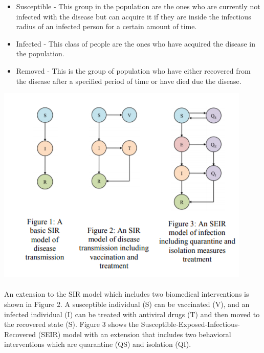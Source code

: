 \documentclass[14pt, a4paper]{extarticle}
\begin{document}
        \begin{itemize}
            \item Susceptible - This group in the population are the ones who are currently not infected with the disease but can acquire it if they are inside the infectious radius of an infected person for a certain amount of time.
            
            \item Infected - This class of people are the ones who have acquired the disease in the population.
            
            \item Removed - This is the group of population who have either recovered from the disease after a specified period of time or have died due the disease.
        \end{itemize}
        
        \begin{center}
            \includegraphics[scale=1.25]{images/sir_diag.png}
        \end{center}
        
        \paragraph{} An extension to the SIR model which includes two biomedical interventions is shown in Figure 2. A susceptible individual (S) can be vaccinated (V), and an infected individual (I) can be treated with antiviral drugs (T) and then moved to the recovered state (S). Figure 3 shows the Susceptible-Exposed-Infectious-Recovered (SEIR) model with an extension that includes two behavioral interventions which are quarantine (QS) and isolation (QI).
	
\end{document}
